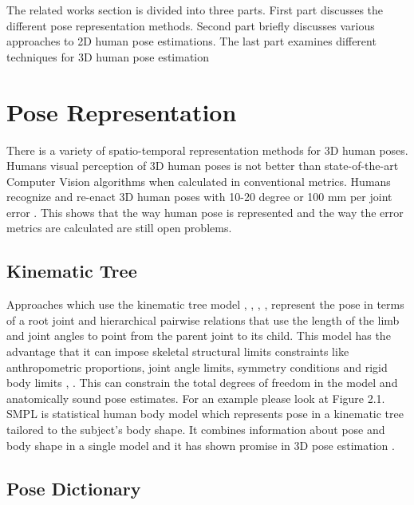 The related works section is divided into three parts. First part discusses the different pose representation methods. Second part briefly discusses various approaches to 2D human pose estimations. The last part examines different techniques for 3D human pose estimation 

\section{Pose Representation}

There is a variety of spatio-temporal representation methods for 3D human poses. Humans visual perception of 3D human poses is not better than state-of-the-art Computer Vision algorithms when calculated in conventional metrics. Humans recognize and re-enact 3D human poses with 10-20 degree or 100 mm per joint error \parencite{marinoiu2013pictorial}. This shows that the way human pose is represented and the way the error metrics are calculated are still open problems.

\subsection{Kinematic Tree}

Approaches which use the kinematic tree model \parencite{barron2001estimating}, \parencite{wei2009modeling}, \parencite{zhou2016deep}, \parencite{sun2017compositional}, \parencite{mehta2017monocular} represent the pose in terms of a root joint and hierarchical pairwise relations that use the length of the limb and joint angles to point from the parent joint to its child. This model has the advantage that it can impose  skeletal structural limits constraints like anthropometric proportions, joint angle limits, symmetry conditions and rigid body limits \parencite{dabral2017structure}, \parencite{wei2009modeling}. This can constrain the total degrees of freedom in the model and anatomically sound pose estimates. For an example please look at Figure 2.1. SMPL \parencite{loper2015smpl} is statistical human body model which represents pose in a kinematic tree tailored to the subject’s body shape. It combines information about pose and body shape in a single model and it has shown promise in 3D pose estimation \parencite{bogo2016keep}.

\subsection{Pose Dictionary}

